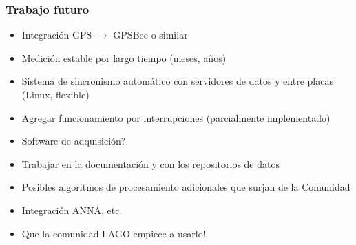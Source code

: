 \documentclass{beamer}
\begin{document}
\begin{frame}
				\frametitle{Trabajo futuro}
				\begin{exampleblock}{}
								\begin{itemize}
												\item Integración GPS $\to$ GPSBee o similar 
												\item Medición estable por largo tiempo (meses, años)
												\item Sistema de sincronismo automático con servidores de datos y entre
																placas (Linux, flexible)
												\item Agregar funcionamiento por interrupciones (parcialmente
																implementado)
												\item Software de adquisición?
												\item Trabajar en la documentación y con los repositorios de datos
												\item Posibles algoritmos de procesamiento adicionales que surjan de la
																Comunidad
												\item Integración ANNA, etc.
												\item \alert{Que la comunidad LAGO empiece a usarlo!}
								\end{itemize}
				\end{exampleblock}
\end{frame}
\end{document}
